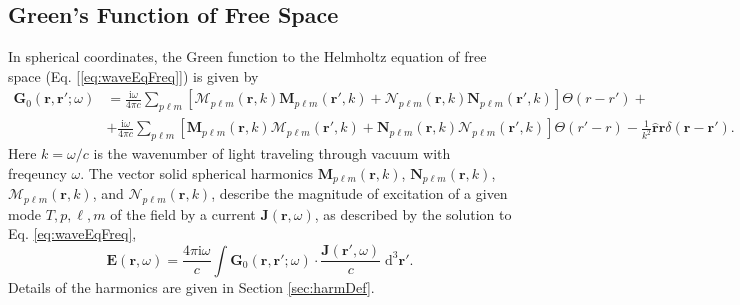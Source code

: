 \documentclass{article}
\numberwithin{equation}{section}
\begin{document}
\subsection{Green's Function of Free Space}

In spherical coordinates, the Green function to the Helmholtz equation of free space (Eq. [\ref{eq:waveEqFreq}]) is given by
\begin{equation}\label{eq:G0}
\begin{split}
\mathbf{G}_0(\mathbf{r},\mathbf{r}';\omega) &= \frac{\mathrm{i}\omega}{4\pi c}\sum_{p\ell m}\left[\bm{\mathcal{M}}_{p\ell m}(\mathbf{r},k)\mathbf{M}_{p\ell m}(\mathbf{r}',k) + \bm{\mathcal{N}}_{p\ell m}(\mathbf{r},k)\mathbf{N}_{p\ell m}(\mathbf{r}',k)\right]\Theta(r - r') + \\
&+ \frac{\mathrm{i}\omega}{4\pi c}\sum_{p\ell m}\left[\mathbf{M}_{p\ell m}(\mathbf{r},k)\bm{\mathcal{M}}_{p\ell m}(\mathbf{r}',k) + \mathbf{N}_{p\ell m}(\mathbf{r},k)\bm{\mathcal{N}}_{p\ell m}(\mathbf{r}',k)\right]\Theta(r' - r) - \frac{1}{k^2}\hat{\mathbf{r}}\hat{\mathbf{r}}\delta(\mathbf{r} - \mathbf{r}').
\end{split}
\end{equation}
Here $k = \omega/c$ is the wavenumber of light traveling through vacuum with freqeuncy $\omega$. The vector solid spherical harmonics $\mathbf{M}_{p\ell m}(\mathbf{r},k)$, $\mathbf{N}_{p\ell m}(\mathbf{r},k)$, $\bm{\mathcal{M}}_{p\ell m}(\mathbf{r},k)$, and $\bm{\mathcal{N}}_{p\ell m}(\mathbf{r},k)$, describe the magnitude of excitation of a given mode $T,p,\ell,m$ of the field by a current $\mathbf{J}(\mathbf{r},\omega)$, as described by the solution to Eq. \ref{eq:waveEqFreq},
\begin{equation}
\mathbf{E}(\mathbf{r},\omega) = \frac{4\pi\mathrm{i}\omega}{c}\int\mathbf{G}_0(\mathbf{r},\mathbf{r}';\omega)\cdot\frac{\mathbf{J}(\mathbf{r}',\omega)}{c}\;\mathrm{d}^3\mathbf{r}'.
\end{equation}
Details of the harmonics are given in Section \ref{sec:harmDef}. 


\end{document}
